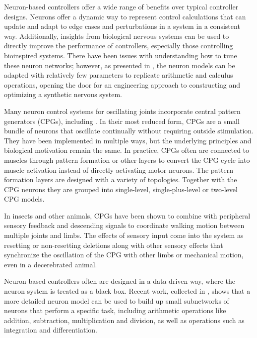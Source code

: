 
Neuron-based controllers offer a wide range of benefits over typical controller
designs. Neurons offer a dynamic way to represent control calculations that can
update and adapt to edge cases and perturbations in a system in a consistent 
way. Additionally, insights from biological nervous systems can be used to 
directly improve the performance of controllers, especially those controlling 
bioinspired systems. There have been issues with understanding how
to tune these neuron networks; however, as presented in 
\cite{NickFunctionalSubnetwork}, the neuron models can be adapted with 
relatively few parameters to replicate arithmetic and calculus operations, 
opening the door for an engineering approach to constructing and optimizing a synthetic nervous system.


Many neuron control systems for oscillating joints incorporate central pattern
generators (CPGs), including 
\cite{Narioka2012, EventBasedWalking, HuntHindLegWalking, HuntPhDThesis}.
In their most reduced form, CPGs are a small bundle of
neurons that oscillate continually without requiring outside stimulation. They
have been implemented in multiple ways, but the underlying principles and 
biological motivation remain the same.
\cite{CPGReview}
In
practice, CPGs often are connected to muscles through pattern formation or other
layers to convert the CPG cycle into muscle activation instead of directly
activating motor neurons. The pattern formation layers are designed with a variety of topologies. Together with the CPG neurons they are grouped into single-level,
single-plus-level or two-level CPG models. \cite{MultiLevelCPG}

In insects and other animals, CPGs have been shown to combine with peripheral 
sensory feedback and
descending signals to coordinate walking motion between multiple joints and
limbs. The effects of sensory input come into the system as resetting or non-resetting deletions
along with other sensory effects that synchronize the oscillation of the CPG
with other limbs or mechanical motion, even in a decerebrated animal.
\cite{SixLeggedWalking, CPGReview}


Neuron-based controllers often are designed in a data-driven way, where the
neuron system is treated as a black box. Recent work, collected in 
\cite{NickFunctionalSubnetwork}, shows that a more detailed neuron model can be
used to build up small subnetworks of neurons that perform a specific task,
including arithmetic operations like addition, subtraction, multiplication and
division, as well as operations such as integration and differentiation.


